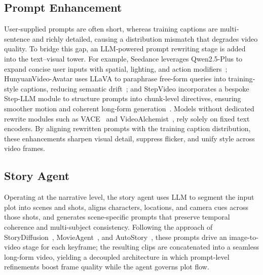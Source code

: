 \subsection{Prompt Enhancement}
User‐supplied prompts are often short, whereas training captions are multi‐sentence and richly detailed, causing a distribution mismatch that degrades video quality. To bridge this gap, an LLM‐powered prompt rewriting stage is added into the text–visual tower. For example, Seedance leverages Qwen2.5-Plus to expand concise user inputs with spatial, lighting, and action modifiers~\cite{gao2025seedance}; HunyuanVideo-Avatar uses LLaVA to paraphrase free-form queries into training‐style captions, reducing semantic drift~\cite{chen2025hunyuanvideoavatar}; and StepVideo incorporates a bespoke Step-LLM module to structure prompts into chunk‐level directives, ensuring smoother motion and coherent long‐form generation~\cite{huang2025stepvideo}. Models without dedicated rewrite modules such as VACE~\cite{vace2025} and VideoAlchemist~\cite{chen2025videoalchemist}, rely solely on fixed text encoders. By aligning rewritten prompts with the training caption distribution, these enhancements sharpen visual detail, suppress flicker, and unify style across video frames.  


\subsection{Story Agent}
Operating at the narrative level, the story agent uses LLM to segment the input plot into scenes and shots, aligns characters, locations, and camera cues across those shots, and generates scene-specific prompts that preserve temporal coherence and multi-subject consistency. Following the approach of StoryDiffusion~\cite{zhou2024storydiffusion}, MovieAgent~\cite{movieagent2025}, and AutoStory~\cite{liu2023autostory}, these prompts drive an image-to-video stage for each keyframe; the resulting clips are concatenated into a seamless long-form video, yielding a decoupled architecture in which prompt-level refinements boost frame quality while the agent governs plot flow.